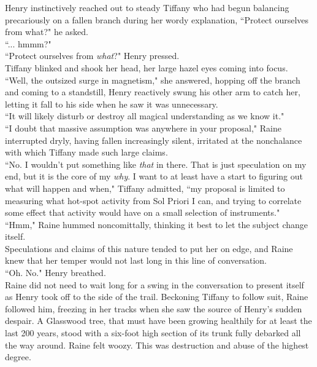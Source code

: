 Henry instinctively reached out to steady Tiffany who had begun balancing precariously on a fallen branch during her wordy explanation, ``Protect ourselves from what?" he asked.\\
``... hmmm?"\\
``Protect ourselves from \textit{what}?" Henry pressed.\\
Tiffany blinked and shook her head, her large hazel eyes coming into focus.\\
``Well, the outsized surge in magnetism," she answered, hopping off the branch and coming to a standstill, Henry reactively swung his other arm to catch her, letting it fall to his side when he saw it was unnecessary.\\
``It will likely disturb or destroy all magical understanding as we know it."\\

``I doubt that massive assumption was anywhere in your proposal," Raine interrupted dryly, having fallen increasingly silent, irritated at the nonchalance with which Tiffany made such large claims.\\
``No. I wouldn't put something like \textit{that} in there. That is just speculation on my end, but it is the core of my \textit{why}. I want to at least have a start to figuring out what will happen and when," Tiffany admitted, ``my proposal is limited to measuring what hot-spot activity from Sol Priori I can, and trying to correlate some effect that activity would have on a small selection of instruments."\\

``Hmm," Raine hummed noncomittally, thinking it best to let the subject change itself.\\
Speculations and claims of this nature tended to put her on edge, and Raine knew that her temper would not last long in this line of conversation.\\

``Oh. No." Henry breathed.\\
Raine did not need to wait long for a swing in the conversation to present itself as Henry took off to the side of the trail. 
Beckoning Tiffany to follow suit, Raine followed him, freezing in her tracks when she saw the source of Henry's sudden despair.
A Glasswood tree, that must have been growing healthily for at least the last 200 years, stood with a six-foot high section of its trunk fully debarked all the way around.
Raine felt woozy. 
This was destruction and abuse of the highest degree.\\

